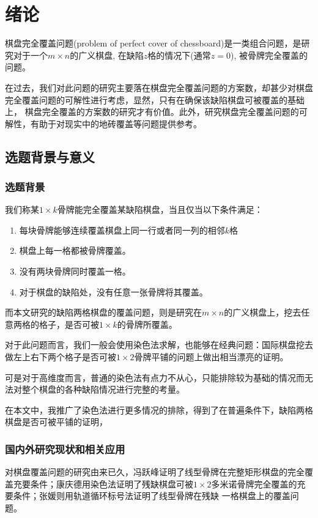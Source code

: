\chapter{绪论}
棋盘完全覆盖问题(problem of perfect cover of chessboard)是一类组合问题，是研究对于一个$m \times n$的广义棋盘, 在缺陷$z$格的情况下(通常$z=0$), 被骨牌完全覆盖的问题。

在过去，我们对此问题的研究主要落在棋盘完全覆盖问题的方案数，却甚少对棋盘完全覆盖问题的可解性进行考虑，显然，只有在确保该缺陷棋盘可被覆盖的基础上，
棋盘完全覆盖的方案数的研究才有价值。此外，研究棋盘完全覆盖问题的可解性，有助于对现实中的地砖覆盖等问题提供参考。

\section{选题背景与意义}

\subsection{选题背景}

我们称某$1 \times k$骨牌能完全覆盖某缺陷棋盘，当且仅当以下条件满足：
\begin{enumerate}
    \item 每块骨牌能够连续覆盖棋盘上同一行或者同一列的相邻$k$格
    \item 棋盘上每一格都被骨牌覆盖。
    \item 没有两块骨牌同时覆盖一格。
    \item 对于棋盘的缺陷处，没有任意一张骨牌将其覆盖。
\end{enumerate}

而本文研究的缺陷两格棋盘的覆盖问题，则是研究在$m \times n$的广义棋盘上，挖去任意两格的格子，是否可被$1 \times k$的骨牌所覆盖。

对于此问题而言，我们一般会使用染色法求解，也能够在经典问题：国际棋盘挖去做左上右下两个格子是否可被$1 \times 2$骨牌平铺的问题上做出相当漂亮的证明。

可是对于高维度而言，普通的染色法有点力不从心，只能排除较为基础的情况而无法对整个棋盘的各种缺陷情况进行完整的考量。

在本文中，我推广了染色法进行更多情况的排除，得到了在普遍条件下，缺陷两格棋盘是否可被平铺的证明，

\subsection{国内外研究现状和相关应用}
\label{sec:related_work}
对棋盘覆盖问题的研究由来已久，冯跃峰证明了线型骨牌在完整矩形棋盘的完全覆盖充要条件；康庆德用染色法证明了残缺棋盘可被$1 \times 2$多米诺骨牌完全覆盖的充要条件；张媛则用轨道循环标号法证明了线型骨牌在残缺
一格棋盘上的覆盖问题。

